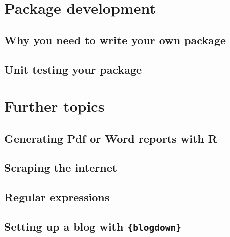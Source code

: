 \documentclass[]{gitbook}
\theoremstyle{definition}
\theoremstyle{definition}
\theoremstyle{definition}
\theoremstyle{remark}
\begin{document}
\hypertarget{package-development}{%
\section{Package development}\label{package-development}}

\hypertarget{why-you-need-to-write-your-own-package}{%
\subsection{Why you need to write your own
package}\label{why-you-need-to-write-your-own-package}}

\hypertarget{unit-testing-your-package}{%
\subsection{Unit testing your package}\label{unit-testing-your-package}}

\hypertarget{further-topics}{%
\section{Further topics}\label{further-topics}}

\hypertarget{generating-pdf-or-word-reports-with-r}{%
\subsection{Generating Pdf or Word reports with
R}\label{generating-pdf-or-word-reports-with-r}}

\hypertarget{scraping-the-internet}{%
\subsection{Scraping the internet}\label{scraping-the-internet}}

\hypertarget{regular-expressions}{%
\subsection{Regular expressions}\label{regular-expressions}}

\hypertarget{setting-up-a-blog-with-blogdown}{%
\subsection{\texorpdfstring{Setting up a blog with
\texttt{\{blogdown\}}}{Setting up a blog with \{blogdown\}}}\label{setting-up-a-blog-with-blogdown}}


\end{document}
